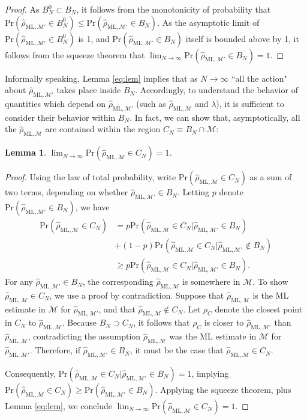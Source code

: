 \documentclass[aps,pra, twocolumn]{revtex4-1}
\newcommand{\M}{\mathcal{M}}
\newcommand{\rhohat}{\hat{\rho}}
\newcommand{\rhoML}[1]{\rhohat_{\scriptscriptstyle{\mathrm{ML},#1}}}
\newtheorem{lem}{Lemma}
\begin{document}
\begin{proof}
As $B^{0}_{N} \subset B_{N}$, it follows from the monotonicity of probability that $\mathrm{Pr}(\rhoML{\M'} \in B^{0}_{N}) \leq \mathrm{Pr}(\rhoML{\M'} \in B_{N})$. As the asymptotic limit of $\mathrm{Pr}(\rhoML{\M'} \in B^{0}_{N})$ is 1, and $\mathrm{Pr}(\rhoML{\M'} \in B_{N})$ itself is bounded above by 1, it follows from the squeeze theorem that $\lim_{N\rightarrow \infty}\mathrm{Pr}(\rhoML{\M'} \in B_{N})=1$.
\end{proof}

Informally speaking, Lemma \ref{eq:lem} implies that as $N\rightarrow \infty$ ``all the action" about $\rhoML{\M'}$ takes place inside $B_{N}$. Accordingly, to understand the behavior of quantities which depend on $\rhoML{\M'}$ (such as $\rhoML{\M}$ and $\lambda$), it is sufficient to consider their behavior within $B_{N}$. In fact, we can show that, asymptotically, all the $\rhoML{\M}$ are contained within the region $C_{N} \equiv B_{N} \cap \M$:

\begin{lem}
\label{eq:rhoMLlem}
$\lim_{N\rightarrow \infty}\mathrm{Pr}(\rhoML{\M} \in C_{N}) = 1$.
\end{lem}
\begin{proof}
Using the law of total probability, write $\mathrm{Pr}(\rhoML{\M} \in C_{N})$ as a sum of two terms, depending on whether $\rhoML{\M'} \in B_{N}$. Letting $p$ denote $\mathrm{Pr}(\rhoML{\M'} \in B_{N})$, we have
\begin{align*}
\mathrm{Pr}(\rhoML{\M} \in C_{N}) &= p\mathrm{Pr}(\rhoML{\M} \in C_{N} | \rhoML{\M'} \in B_{N})\\
&+(1-p)\mathrm{Pr}(\rhoML{\M} \in C_{N} | \rhoML{\M'} \not\in B_{N})\\
& \geq p\mathrm{Pr}(\rhoML{\M} \in C_{N} | \rhoML{\M'} \in B_{N}).
\end{align*}
For any $\rhoML{\M'} \in B_{N}$, the corresponding $\rhoML{\M}$ is somewhere in $\M$. To show $\rhoML{\M} \in C_{N}$, we use a proof by contradiction. Suppose that $\rhoML{\M}$ is the ML estimate in $\M$ for $\rhoML{\M'}$, and that $\rhoML{\M} \not \in C_{N}$. Let $\rho_{C}$ denote the closest point in $C_{N}$ to $\rhoML{\M}$. Because $B_{N} \supset C_{N}$, it follows that $\rho_{C}$ is closer to $\rhoML{\M'}$ than $\rhoML{\M}$, contradicting the assumption $\rhoML{\M}$ was the ML estimate in $\M$ for $\rhoML{\M'}$. Therefore, if $\rhoML{\M'} \in B_{N}$, it must be the case that $\rhoML{\M} \in C_{N}$.

Consequently, $\mathrm{Pr}(\rhoML{\M} \in C_{N} | \rhoML{\M'} \in B_{N}) = 1$, implying $\mathrm{Pr}(\rhoML{\M} \in C_{N}) \geq \mathrm{Pr}(\rhoML{\M'} \in B_{N})$. Applying the squeeze theorem, plus Lemma \ref{eq:lem}, we conclude $\lim_{N\rightarrow \infty}\mathrm{Pr}(\rhoML{\M} \in C_{N}) = 1$.
\end{proof}
\end{document}
